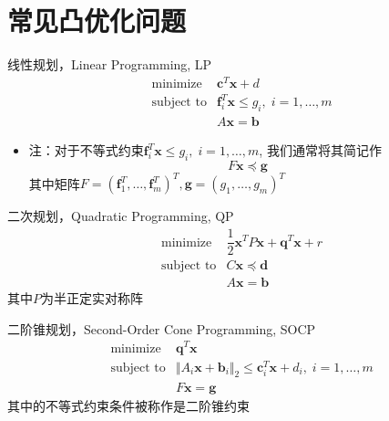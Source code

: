 
\section{常见凸优化问题}


\begin{frame}

\begin{block}{线性规划，Linear Programming, LP}
\begin{eqnarray*}
& \text{minimize} & \mathbf{c}^T \mathbf{x} + d \\
& \text{subject to} & \mathbf{f}_i^T \mathbf{x} \le g_i, \; i = 1,\ldots,m \\
& & A\mathbf{x} = \mathbf{b}
\end{eqnarray*}

\begin{itemize}
\item 注：对于不等式约束$\mathbf{f}_i^T \mathbf{x} \le g_i, \; i = 1,\ldots,m$, 我们通常将其简记作
\[F\mathbf{x} \preccurlyeq \mathbf{g}\]
其中矩阵$F = (\mathbf{f}_1^T, \ldots, \mathbf{f}_m^T)^T, \mathbf{g} = (g_1, \ldots, g_m)^T$
\end{itemize}
\end{block}

\end{frame}


\begin{frame}

\begin{block}{二次规划，Quadratic Programming, QP}
\begin{eqnarray*}
& \text{minimize} & \dfrac{1}{2}\mathbf{x}^T P  \mathbf{x} + \mathbf{q}^T \mathbf{x} + r \\
& \text{subject to} & C \mathbf{x} \preccurlyeq \mathbf{d} \\
& & A\mathbf{x} = \mathbf{b}
\end{eqnarray*}
其中$P$为半正定实对称阵
\end{block}

\end{frame}


\begin{frame}

\begin{block}{二阶锥规划，Second-Order Cone Programming, SOCP}
\begin{eqnarray*}
& \text{minimize} & \mathbf{q}^T \mathbf{x} \\
& \text{subject to} & \Vert A_i\mathbf{x} + \mathbf{b}_i \Vert_2 \le \mathbf{c}_i^T \mathbf{x} + d_i, \; i = 1,\ldots,m \\
& & F\mathbf{x} = \mathbf{g}
\end{eqnarray*}
其中的不等式约束条件被称作是二阶锥约束
\end{block}

\end{frame}

